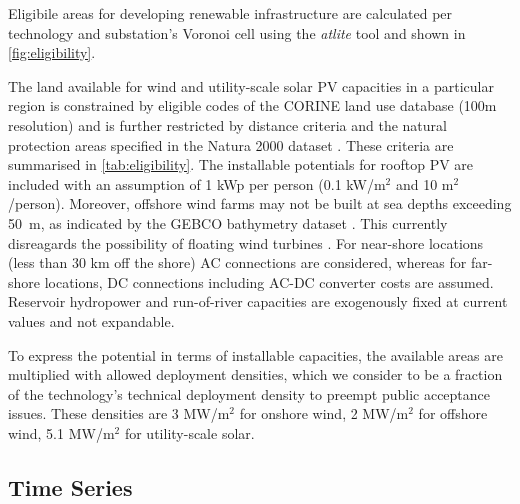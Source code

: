 Eligibile areas for developing renewable infrastructure are calculated per
technology and substation's Voronoi cell using the \textit{atlite} tool
 and shown in \cref{fig:eligibility}.

The land available for wind and utility-scale solar PV capacities in a
particular region is constrained by eligible codes of the CORINE land use
database (100m resolution)  and is
further restricted by distance criteria and the natural protection areas
specified in the Natura 2000 dataset
. These criteria are summarised in
\cref{tab:eligibility}. The installable potentials for rooftop PV are included
with an assumption of 1 kWp per person (0.1 kW/m$^2$ and 10 m$^2$/person).
Moreover, offshore wind farms may not be built at sea depths exceeding
\SI{50}{\metre}, as indicated by the GEBCO bathymetry dataset . This
currently disreagards the possibility of floating wind turbines
.
For near-shore locations (less than 30 km off the shore) AC connections are
considered, whereas for far-shore locations, DC connections including AC-DC
converter costs are assumed. Reservoir hydropower and run-of-river capacities
are exogenously fixed at current values and not expandable.

To express the potential in terms of installable capacities, the available areas
are multiplied with allowed deployment densities, which we consider to be a
fraction of the technology's technical deployment density to preempt public
acceptance issues. These densities are 3 MW/m$^ 2$ for onshore wind, 2 MW/m$^2$ for
offshore wind, 5.1 MW/m$^2$ for utility-scale solar.


\subsection{Time Series}
\label{sec:si:renewable-ts}


